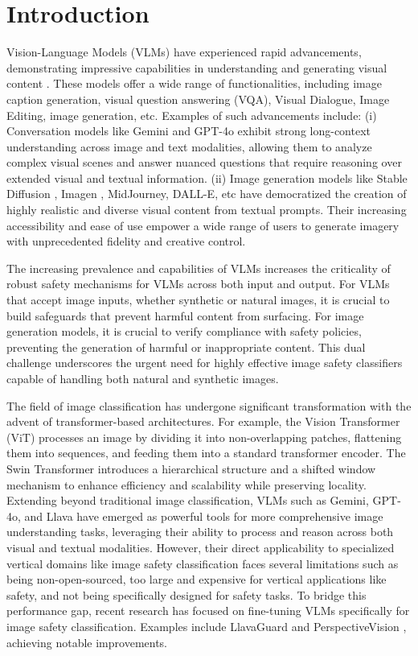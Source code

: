 
\section{Introduction} 
Vision-Language Models (VLMs) have experienced rapid advancements, demonstrating impressive capabilities in understanding and generating visual content \citep{team2023gemini, achiam2023gpt, li2023blip, dubey2024llama}. These models offer a wide range of functionalities, including image caption generation, visual question answering (VQA), Visual Dialogue, Image Editing, image generation, etc. Examples of such advancements include: (i) Conversation models like Gemini \cite{team2023gemini} and GPT-4o \citep{achiam2023gpt} exhibit strong long-context understanding across image and text modalities, allowing them to analyze complex visual scenes and answer nuanced questions that require reasoning over extended visual and textual information. (ii) Image generation models like Stable Diffusion \citep{rombach2022high}, Imagen \citep{saharia2022photorealistic}, MidJourney, DALL-E\citep{ramesh2021zero}, etc have democratized the creation of highly realistic and diverse visual content from textual prompts. Their increasing accessibility and ease of use empower a wide range of users to generate imagery with unprecedented fidelity and creative control.

The increasing prevalence and capabilities of VLMs increases the criticality of robust safety mechanisms for VLMs across both input and output. For VLMs that accept image inputs, whether synthetic or natural images, it is crucial to build safeguards that prevent harmful content from surfacing. For image generation models, it is crucial to verify compliance with safety policies, preventing the generation of harmful or inappropriate content. This dual challenge underscores the urgent need for highly effective image safety classifiers capable of handling both natural and synthetic images.


The field of image classification has undergone significant transformation with the advent of transformer-based architectures. For example, the Vision Transformer (ViT) \citep{dosovitskiy2020image} processes an image by dividing it into non-overlapping patches, flattening them into sequences, and feeding them into a standard transformer encoder. The Swin Transformer \citep{liu2021swin} introduces a hierarchical structure and a shifted window mechanism to enhance efficiency and scalability while preserving locality. Extending beyond traditional image classification, VLMs such as Gemini, GPT-4o, and Llava have emerged as powerful tools for more comprehensive image understanding tasks, leveraging their ability to process and reason across both visual and textual modalities. However, their direct applicability to specialized vertical domains like image safety classification faces several limitations such as being non-open-sourced, too large and expensive for vertical applications like safety, and not being specifically designed for safety tasks. To bridge this performance gap, recent research has focused on fine-tuning VLMs specifically for image safety classification. Examples include LlavaGuard \citep{helff2024llavaguard} and PerspectiveVision \citep{qu2024unsafebench}, achieving notable improvements.


